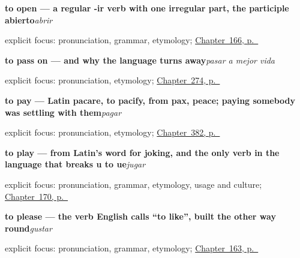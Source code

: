 \noindent\begin{minipage}[t]{\linewidth}
\raggedright
\textbf{to open — a regular -ir verb with one irregular part, the participle abierto}\enspace\emph{abrir}\par
\footnotesize explicit focus: pronunciation, grammar, etymology; \hyperref[ch:spanish-open-close-sit-stand]{Chapter~166, p.~\pageref*{ch:spanish-open-close-sit-stand}}
\end{minipage}\par\smallskip

\noindent\begin{minipage}[t]{\linewidth}
\raggedright
\textbf{to pass on — and why the language turns away}\enspace\emph{pasar a mejor vida}\par
\footnotesize explicit focus: pronunciation, etymology; \hyperref[ch:peso-cultural]{Chapter~274, p.~\pageref*{ch:peso-cultural}}
\end{minipage}\par\smallskip

\noindent\begin{minipage}[t]{\linewidth}
\raggedright
\textbf{to pay — Latin pacare, to pacify, from pax, peace; paying somebody was settling with them}\enspace\emph{pagar}\par
\footnotesize explicit focus: pronunciation, etymology; \hyperref[ch:acabar-y-empezar]{Chapter~382, p.~\pageref*{ch:acabar-y-empezar}}
\end{minipage}\par\smallskip

\noindent\begin{minipage}[t]{\linewidth}
\raggedright
\textbf{to play — from Latin's word for joking, and the only verb in the language that breaks u to ue}\enspace\emph{jugar}\par
\footnotesize explicit focus: pronunciation, grammar, etymology, usage and culture; \hyperref[ch:spanish-jugar]{Chapter~170, p.~\pageref*{ch:spanish-jugar}}
\end{minipage}\par\smallskip

\noindent\begin{minipage}[t]{\linewidth}
\raggedright
\textbf{to please — the verb English calls \textquotedblleft{}to like\textquotedblright{}, built the other way round}\enspace\emph{gustar}\par
\footnotesize explicit focus: pronunciation, grammar, etymology; \hyperref[ch:spanish-gustar]{Chapter~163, p.~\pageref*{ch:spanish-gustar}}
\end{minipage}\par\smallskip

